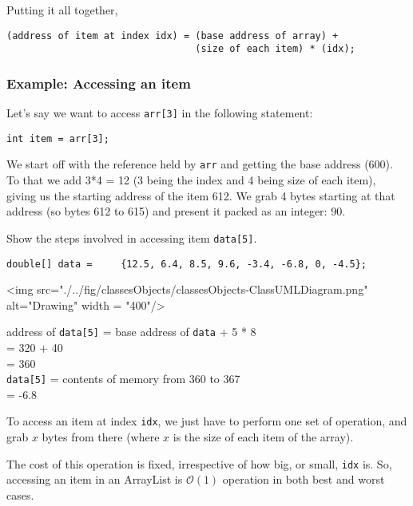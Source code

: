 Putting it all together,

\begin{verbatim}
(address of item at index idx) = (base address of array) + 
                                 (size of each item) * (idx);
\end{verbatim}

\subsubsection{Example: Accessing an item}

Let's say we want to access \texttt{arr[3]} in the following statement:

\begin{lstlisting}
int item = arr[3];
\end{lstlisting}

We start off with the reference held by \texttt{arr} and getting the base address (600). To that we add 3*4 = 12 (3 being the index and 4 being size of each item), giving us the starting address of the item 612. We grab 4 bytes starting at that address (so bytes 612 to 615) and present it packed as an integer: 90.

\begin{exercise}
Show the steps involved in accessing item \texttt{data[5]}.

\vskip 0.5cm
\begin{lstlisting}
double[] data = 	{12.5, 6.4, 8.5, 9.6, -3.4, -6.8, 0, -4.5};
\end{lstlisting}

<img src="./../fig/classesObjects/classesObjects-ClassUMLDiagram.png" alt="Drawing" width = "400"/>
\newline
\end{exercise}
\begin{answer}
address of \texttt{data[5]} = base address of \texttt{data} + 5 * 8\\
= 320 + 40 \\
= 360\\

\texttt{data[5]} = contents of memory from 360 to 367 \\
= -6.8	
\end{answer}

To access an item at index \texttt{idx}, we just have to perform one set of operation, and grab $x$ bytes from there (where $x$ is the size of each item of the array). 

The cost of this operation is fixed, irrespective of how big, or small, \texttt{idx} is. So, accessing an item in an ArrayList is $\mathcal{O}(1)$ operation in both best and worst cases.

